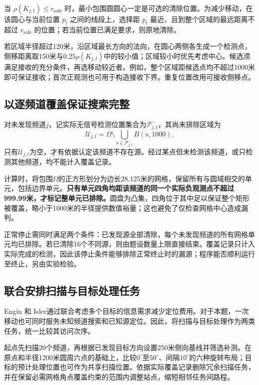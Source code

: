 当 \(\rho(K_{j,t})\le r_{\mathrm{safe}}\) 时，最小包围圆圆心一定是可选的清除位置。为减少移动，在该圆心与当前位置 \(p_t\) 之间的线段上，选择距 \(p_t\) 最近、且到整个区域的最远距离不超过 \(r_{\mathrm{safe}}\) 的位置；若当前位置已满足要求，则原地清除。

若区域半径超过120米，沿区域最长方向的法向，在圆心两侧各生成一个检测点，侧移距离取150米与$0.25\rho(K_{j,t})$中的较小值；区域较小时优先考虑中心。候选须满足接收的充分条件，再选移动较近者。例如，整个区域距候选点均不超过1000米即可保证接收；首次正观测也可用于构造接收下界。重复位置改用可接收侧移点。

\subsection{以逐频道覆盖保证搜索完整}

对未发现频道$j$，记实际无信号检测位置集合为$\mathcal P^-_{j,t}$，其尚未排除区域为
\begin{equation}
\mathcal U_{j,t}=\Omega\setminus
 \bigcup_{s\in\mathcal P^-_{j,t}}B(s,1000).
\label{eq:q3-uncovered}
\end{equation}
只有$\mathcal U_{j,t}$为空，才有依据认定该频道不存在源。经过某点但未检测该频道，或只检测其他频道，均不能计入覆盖记录。

计算时，将包围$\Omega$的正方形划分为边长28.125米的网格，保留所有与圆域相交的单元，包括边界单元。\textbf{只有单元四角均距该频道的同一个实际负观测点不超过999.99米，才标记整单元已排除。}圆盘为凸集，四角位于其中足以保证整个矩形被覆盖，略小于1000米的半径提供数值裕量；这也避免了仅检查网格中心造成漏判。

正常停止需同时满足两个条件：已发现源全部清除，每个未发现频道的所有网格单元均已排除。若已清除16个不同源，则由题设数量上限直接结束。覆盖记录只计入实际完成的检测，因此该停止条件能够排除正常终止时的漏源；程序能否顺利运行至终止，另由实验检验。

\subsection{联合安排扫描与目标处理任务}

Engin 和 Isler\cite{Engin2020}通过联合考虑多个目标的信息需求减少定位费用。对于本题，一次移动也可同时服务未知频道搜索和已知源定位。因此，将扫描与目标处理作为两类任务，统一比较其访问次序。

起点先扫描20个频道，再根据已发现目标方向设置250米侧向基线并筛选补测。在原点和半径1200米圆周六点的基础上，比较$0^\circ$至$50^\circ$、间隔$10^\circ$的六种旋转布局；目标的预计处理位置也可作为共享扫描位置。依据实际覆盖记录删除冗余扫描任务，并在保留必需网格角点覆盖约束的范围内调整站点，缩短相邻任务间路程。

